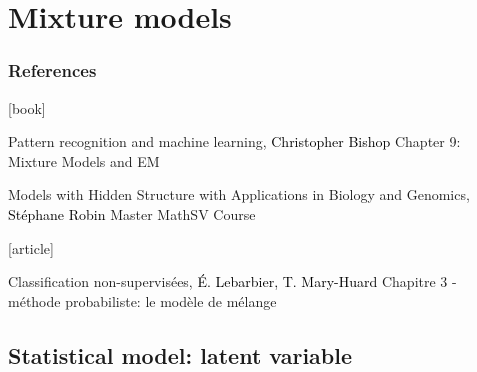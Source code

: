\documentclass{beamer}\usepackage[]{graphicx}\usepackage[]{color}
\begin{document}

\section{Mixture models}

\begin{frame}
  \frametitle{References}

    \begin{thebibliography}{99}
      [book]

     Pattern recognition and machine learning,
    \newblock \textcolor{black}{Christopher Bishop}
    \newblock \alert{Chapter 9: Mixture Models and EM}

     Models with Hidden Structure with Applications in Biology and Genomics,
    \newblock \textcolor{black}{Stéphane Robin}
    \newblock \alert{Master MathSV Course}

      [article]

     Classification non-supervisées,
    \newblock \textcolor{black}{É. Lebarbier, T. Mary-Huard}
    \newblock \alert{Chapitre 3 - méthode probabiliste: le modèle de mélange}

    \end{thebibliography}


\end{frame}

\subsection{Statistical model: latent variable}
\end{document}
